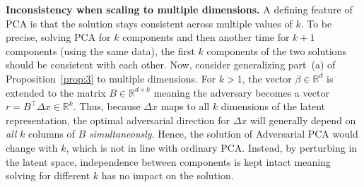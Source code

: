 \documentclass{article}
\newcommand{\R}{\mathbb{R}}
\begin{document}
\textbf{Inconsistency when scaling to multiple dimensions.} A defining feature of PCA is that the solution stays consistent across multiple values of $k$. To be precise, solving PCA for $k$ components and then another time for $k+1$ components (using the same data), the first $k$ components of the two solutions should be consistent with each other. Now, consider generalizing part~(a) of Proposition~\ref{prop:3} to multiple dimensions. For $k>1$, the vector $\beta \in \R^d$ is extended to the matrix $B \in \R^{d \times k}$ meaning the adversary becomes a vector $r = B^\top \Delta x \in \R^k$. Thus, because $\Delta x$ maps to all $k$ dimensions of the latent representation, the optimal adversarial direction for $\Delta x$ will generally depend on \textit{all} $k$ columns of $B$ \textit{simultaneously}. Hence, the solution of Adversarial PCA would change with $k$, which is not in line with ordinary PCA. Instead, by perturbing in the latent space, independence between components is kept intact meaning solving for different $k$ has no impact on the solution. 
\end{document}
